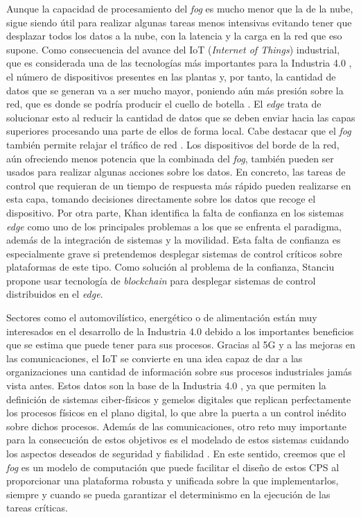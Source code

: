 Aunque la capacidad de procesamiento del \textit{fog} es mucho menor que la de
la nube, sigue siendo útil para realizar algunas tareas menos intensivas
evitando tener que desplazar todos los datos a la nube, con la latencia y la
carga en la red que eso supone. Como consecuencia del avance del IoT
(\textit{Internet of Things}) industrial, que es considerada una de las
tecnologías más importantes para la Industria 4.0 \cite{lu_industry_2017}, el
número de dispositivos presentes en las plantas y, por tanto, la cantidad de
datos que se generan va a ser mucho mayor, poniendo aún más presión sobre la
red, que es donde se podría producir el cuello de botella \cite{shi_edge_2016}.
El \textit{edge} trata de solucionar esto al reducir la cantidad de datos que se
deben enviar hacia las capas superiores procesando una parte de ellos de forma
local. Cabe destacar que el \textit{fog} también permite relajar el tráfico de
red \cite{wang_traffic_2019}. Los dispositivos del borde de la red, aún
ofreciendo menos potencia que la combinada del \textit{fog}, también pueden ser
usados para realizar algunas acciones sobre los datos. En concreto, las tareas
de control que requieran de un tiempo de respuesta más rápido pueden realizarse
en esta capa, tomando decisiones directamente sobre los datos que recoge el
dispositivo. Por otra parte, Khan \cite{khan_edge_2019} identifica la falta de
confianza en los sistemas \textit{edge} como uno de los principales problemas a
los que se enfrenta el paradigma, además de la integración de sistemas y la
movilidad. Esta falta de confianza es especialmente grave si pretendemos
desplegar sistemas de control críticos sobre plataformas de este tipo. Como
solución al problema de la confianza, Stanciu \cite{stanciu_blockchain_2017}
propone usar tecnología de \textit{blockchain} para desplegar sistemas de
control distribuidos en el \textit{edge}.

Sectores como el automovilístico, energético o de alimentación están muy
interesados en el desarrollo de la Industria 4.0 debido a los importantes
beneficios que se estima que puede tener para sus procesos. Gracias al 5G y a
las mejoras en las comunicaciones, el IoT se convierte en una idea capaz de dar
a las organizaciones una cantidad de información sobre sus procesos industriales
jamás vista antes. Estos datos son la base de la Industria 4.0
\cite{khan_perspective_2016}, ya que permiten la definición de sistemas
ciber-físicos y gemelos digitales que replican perfectamente los procesos
físicos en el plano digital, lo que abre la puerta a un control inédito sobre
dichos procesos. Además de las comunicaciones, otro reto muy importante para la
consecución de estos objetivos es el modelado de estos sistemas cuidando los
aspectos deseados de seguridad y fiabilidad \cite{farsi_industry_2019}. En este
sentido, creemos que el \textit{fog} es un modelo de computación que puede
facilitar el diseño de estos CPS al proporcionar una plataforma robusta y
unificada sobre la que implementarlos, siempre y cuando se pueda garantizar el
determinismo en la ejecución de las tareas críticas.

